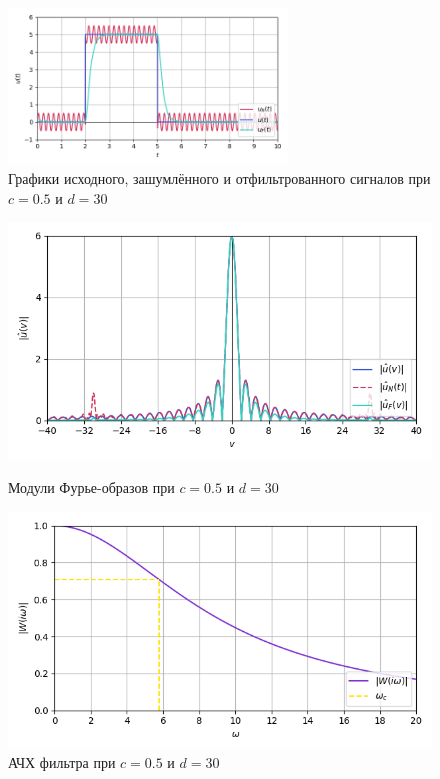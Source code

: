 \documentclass[a4paper]{article}
\begin{document}
\begin{figure}[H]
    \centering \includegraphics[width=0.66\textwidth]{sources/second/part2/c=0.5_d=30 T1=1e-08_T2=0.111_T3=0.111/1_signal_cmp.png}
    \caption{Графики исходного, зашумлённого и отфильтрованного сигналов при $c = 0.5$ и $d = 30$}
\end{figure}\vspace{-1em}
\begin{figure}[H]
    \begin{minipage}{0.49\textwidth}
        \centering \includegraphics[width=\textwidth]{sources/second/part2/c=0.5_d=30 T1=1e-08_T2=0.111_T3=0.111/2_fft_cmp.png}
        \caption{Модули Фурье-образов при $c = 0.5$ и $d = 30$}
    \end{minipage}\hfill
    \begin{minipage}{0.49\textwidth}
        \centering \includegraphics[width=\textwidth]{sources/second/part2/c=0.5_d=30 T1=1e-08_T2=0.111_T3=0.111/3_filter.png}
        \caption{АЧХ фильтра при $c = 0.5$ и $d = 30$}
    \end{minipage}
\end{figure}
\end{document}
